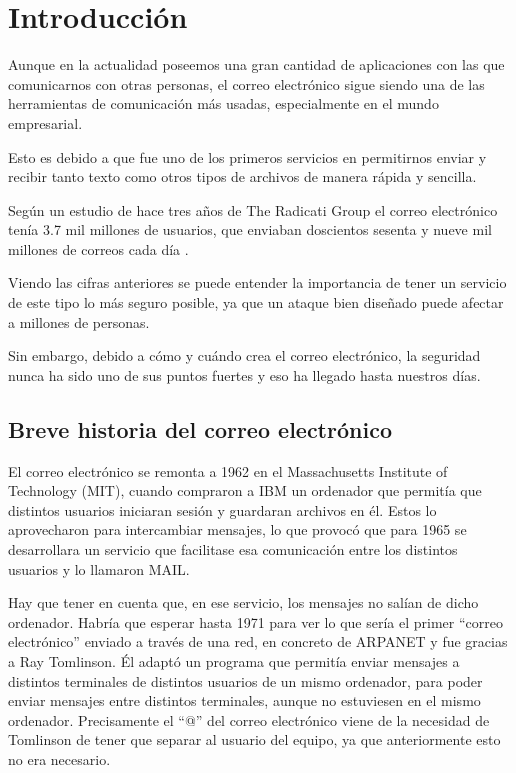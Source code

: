 \chapter{Introducción}
Aunque en la actualidad poseemos una gran cantidad de aplicaciones con las que comunicarnos con otras personas, el correo electrónico sigue siendo una de las herramientas de comunicación más usadas, especialmente en el mundo empresarial. 

Esto es debido a que fue uno de los primeros servicios en permitirnos enviar y recibir tanto texto como otros tipos de archivos de manera rápida y sencilla. 

Según un estudio de hace tres años de The Radicati Group el correo electrónico tenía 3.7 mil millones de usuarios, que enviaban doscientos sesenta y nueve mil millones de correos cada día \cite{cifrasCorreo}.

Viendo las cifras anteriores se puede entender la importancia de tener un servicio de este tipo lo más seguro posible, ya que un ataque bien diseñado puede afectar a millones de personas.

Sin embargo, debido a cómo y cuándo crea el correo electrónico, la seguridad nunca ha sido uno de sus puntos fuertes y eso ha llegado hasta nuestros días.
 
\section{Breve historia del correo electrónico}
El correo electrónico se remonta a 1962 en el Massachusetts Institute of Technology (MIT), cuando compraron a IBM un ordenador que permitía que distintos usuarios iniciaran sesión y guardaran archivos en él. Estos lo aprovecharon para intercambiar mensajes, lo que provocó que para 1965 se desarrollara un servicio que facilitase esa comunicación entre los distintos usuarios y lo llamaron MAIL.

Hay que tener en cuenta que, en ese servicio, los mensajes no salían de dicho ordenador. Habría que esperar hasta 1971 para ver lo que sería el primer “correo electrónico” enviado a través de una red, en concreto de ARPANET y fue gracias a Ray Tomlinson. Él adaptó un programa que permitía enviar mensajes a distintos terminales de distintos usuarios de un mismo ordenador, para poder enviar mensajes entre distintos terminales, aunque no estuviesen en el mismo ordenador. Precisamente el “@” del correo electrónico viene de la necesidad de Tomlinson de tener que separar al usuario del equipo, ya que anteriormente esto no era necesario.

